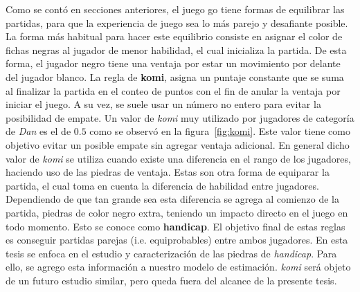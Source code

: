 \documentclass[11pt,twoside,spanish]{report} %
\begin{document}
Como se cont\'o en secciones anteriores, el juego go tiene formas de equilibrar las partidas, para que la experiencia de juego sea lo m\'as parejo y desafiante posible.
La forma m\'as habitual para hacer este equilibrio consiste en asignar el color de fichas negras al jugador de menor habilidad, el cual inicializa la partida.
De esta forma, el jugador negro tiene una ventaja por estar un movimiento por delante del jugador blanco.
La regla de \textbf{komi}, asigna un puntaje constante que se suma al finalizar la partida en el conteo de puntos con el fin de anular la ventaja por iniciar el juego.
A su vez, se suele usar un n\'umero no entero para evitar la posibilidad de empate.
Un valor de \emph{komi} muy utilizado por jugadores de categor\'ia de \textit{Dan} es el de $0.5$  como se observ\'o en la figura~\ref{fig:komi}.
Este valor tiene como objetivo evitar un posible empate sin agregar ventaja adicional.
En general dicho valor de \textit{komi} se utiliza cuando existe una diferencia en el rango de los jugadores, haciendo uso de las piedras de ventaja.
Estas son otra forma de equiparar la partida, el cual toma en cuenta la diferencia de habilidad entre jugadores.
Dependiendo de que tan grande sea esta diferencia se agrega al comienzo de la partida, piedras de color negro extra, teniendo un impacto directo en el juego en todo momento. 
Esto se conoce como \textbf{handicap}.
El objetivo final de estas reglas es conseguir partidas parejas (i.e. equiprobables) entre ambos jugadores.
En esta tesis se enfoca en el estudio y caracterizaci\'on de las piedras de \textit{handicap}.
Para ello, se agrego esta informaci\'on a nuestro modelo de estimaci\'on.
\textit{komi} ser\'a objeto de un futuro estudio similar, pero queda fuera del alcance de la presente tesis.
\end{document}
